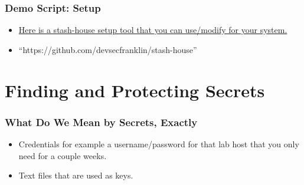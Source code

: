 \documentclass[aspectratio=169]{beamer}
\makeatletter
\def\sectionsubtitle#1{\gdef\@sectionsubtitle{#1}}
\gdef\@sectionsubtitle{}
\makeatother
\begin{document}
\begin{frame}
    \frametitle{Demo Script: Setup}
    \begin{itemize}
        \item \href{ https://github.com/devsecfranklin/stash-house/blob/main/bin/install-client.sh }{Here is a stash-house setup tool that you can use/modify for your system. }
        \item ``https://github.com/devsecfranklin/stash-house''
    \end{itemize}
\end{frame}

\sectionsubtitle{What is it you want to protect?}
\section{Finding and Protecting Secrets}

\begin{frame}
	\frametitle{What Do We Mean by Secrets, Exactly}
	\begin{itemize}
		\item Credentials for example a username/password for that lab host that you only need for a couple weeks.
		\item Text files that are used as keys.
	\end{itemize}


\end{frame}
\end{document}
